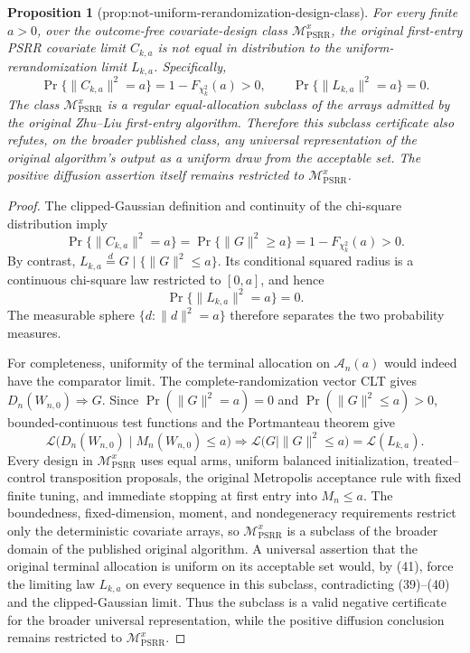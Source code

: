 \documentclass{article}
\newtheorem{proposition}{Proposition}
\begin{document}
\begin{proposition}[prop:not-uniform-rerandomization-design-class]\label{prop:not-uniform-rerandomization-design-class}
For every finite \(a>0\), over the outcome-free covariate-design class \(\mathcal M_{\mathrm{PSRR}}^{x}\), the original first-entry PSRR covariate limit \(C_{k,a}\) is not equal in distribution to the uniform-rerandomization limit \(L_{k,a}\).  Specifically,
\[
 \Pr\{\|C_{k,a}\|^2=a\}=1-F_{\chi_k^2}(a)>0,
 \qquad
 \Pr\{\|L_{k,a}\|^2=a\}=0.
\]
The class \(\mathcal M_{\mathrm{PSRR}}^{x}\) is a regular equal-allocation subclass of the arrays admitted by the original Zhu--Liu first-entry algorithm.  Therefore this subclass certificate also refutes, on the broader published class, any universal representation of the original algorithm's output as a uniform draw from the acceptable set.  The positive diffusion assertion itself remains restricted to \(\mathcal M_{\mathrm{PSRR}}^{x}\).
\end{proposition}
\begin{proof}
The clipped-Gaussian definition and continuity of the chi-square distribution imply
\[
 \Pr\{\|C_{k,a}\|^2=a\}
 =\Pr\{\|G\|^2\ge a\}
 =1-F_{\chi_k^2}(a)>0. \tag{39}
\]
By contrast, \(L_{k,a}\overset d=G\mid\{\|G\|^2\le a\}\).  Its conditional squared radius is a continuous chi-square law restricted to \([0,a]\), and hence
\[
 \Pr\{\|L_{k,a}\|^2=a\}=0. \tag{40}
\]
The measurable sphere \(\{d:\|d\|^2=a\}\) therefore separates the two probability measures.

For completeness, uniformity of the terminal allocation on \(\mathcal A_n(a)\) would indeed have the comparator limit.  The complete-randomization vector CLT gives \(D_n(W_{n,0})\Rightarrow G\).  Since \(\Pr(\|G\|^2=a)=0\) and \(\Pr(\|G\|^2\le a)>0\), bounded-continuous test functions and the Portmanteau theorem give
\[
 \mathcal L\bigl(D_n(W_{n,0})\mid M_n(W_{n,0})\le a\bigr)
 \Rightarrow \mathcal L\bigl(G\mid\|G\|^2\le a\bigr)
 =\mathcal L(L_{k,a}). \tag{41}
\]
Every design in \(\mathcal M_{\mathrm{PSRR}}^x\) uses equal arms, uniform balanced initialization, treated--control transposition proposals, the original Metropolis acceptance rule with fixed finite tuning, and immediate stopping at first entry into \(M_n\le a\).  The boundedness, fixed-dimension, moment, and nondegeneracy requirements restrict only the deterministic covariate arrays, so \(\mathcal M_{\mathrm{PSRR}}^x\) is a subclass of the broader domain of the published original algorithm.  A universal assertion that the original terminal allocation is uniform on its acceptable set would, by (41), force the limiting law \(L_{k,a}\) on every sequence in this subclass, contradicting (39)--(40) and the clipped-Gaussian limit.  Thus the subclass is a valid negative certificate for the broader universal representation, while the positive diffusion conclusion remains restricted to \(\mathcal M_{\mathrm{PSRR}}^x\).
\end{proof}
\end{document}
